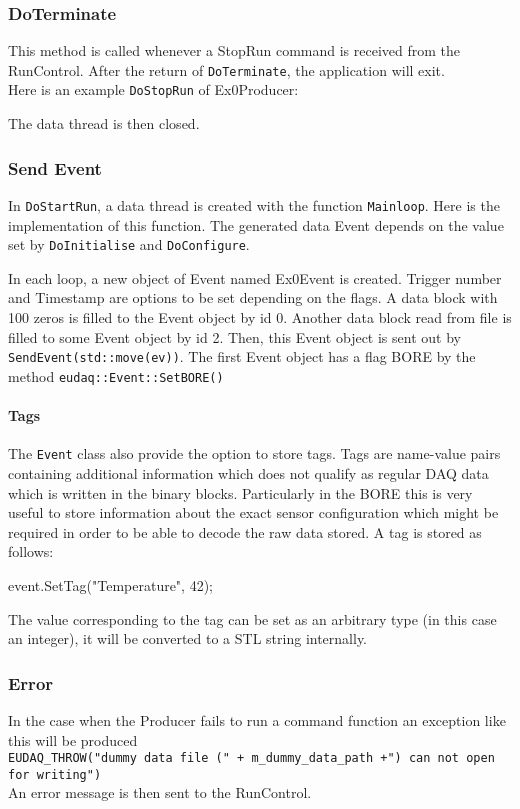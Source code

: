 \subsubsection{DoTerminate}
This method is called whenever a StopRun command is received from the RunControl. After the return of \lstinline[style=cpp]{DoTerminate}, the application will exit.\\
Here is an example \lstinline[style=cpp]{DoStopRun} of Ex0Producer:

The data thread is then closed. 

\subsubsection{Send Event}
In \lstinline[style=cpp]{DoStartRun}, a data thread is created with the function \lstinline[style=cpp]{Mainloop}. Here is the implementation of this function. The generated data Event depends on the value set by \lstinline[style=cpp]{DoInitialise} and \lstinline[style=cpp]{DoConfigure}.

In each loop, a new object of Event named Ex0Event is created. Trigger number and Timestamp are options to be set depending on the flags. A data block with 100 zeros is filled to the Event object by id 0. Another data block read from file is filled to some Event object by id 2. Then, this Event object is sent out by \lstinline[style=cpp]{SendEvent(std::move(ev))}. The first Event object has a flag BORE by the method \lstinline[style=cpp]{eudaq::Event::SetBORE()}

\paragraph{Tags}\label{sec:Tags}
The \texttt{Event} class also provide the option to store tags.
Tags are name-value pairs containing additional information which does not qualify as regular DAQ data which is written in the binary blocks.
Particularly in the \gls{BORE} this is very useful to store information about the exact sensor configuration which might be required in order to be able to decode the raw data stored.
A tag is stored as follows:
\begin{listing}
event.SetTag("Temperature", 42);
\end{listing}

The value corresponding to the tag can be set as an arbitrary type (in this case an integer),
it will be converted to a STL string internally.

\subsubsection{Error}\label{sec:Error}
In the case when the Producer fails to run a command function an exception like this will be produced \\
\lstinline[style=cpp]{EUDAQ_THROW("dummy data file (" + m_dummy_data_path +") can not open for writing")}\\
An error message is then sent to the RunControl.


